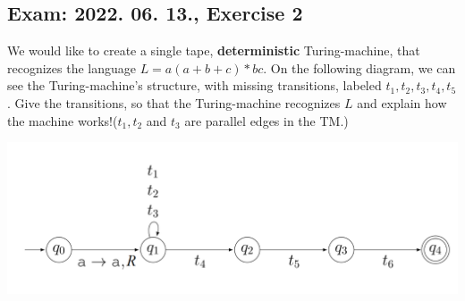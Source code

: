 \subsection{Exam: 2022. 06. 13., Exercise 2}


We would like to create a single tape, \textbf{deterministic} Turing-machine, that recognizes the language $L=a(a+b+c)*bc$. On the following diagram, we can see the Turing-machine's structure, with missing transitions, labeled $t_1, t_2, t_3, t_4, t_5$. Give the transitions, so that the Turing-machine recognizes $L$ and explain how the machine works!($t_1, t_2$ and $t_3$ are parallel edges in the TM.)

\begin{center}
    \includegraphics[width=0.8\linewidth]{exams/2022_06_13/02/tm.png}
\end{center}



